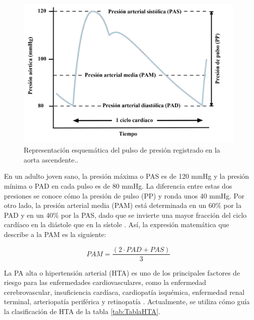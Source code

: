 \begin{figure}[h]
  \centering
  \includegraphics[width=\textwidth]{./Figures/aortic-pulse-pressure.png}
  \caption{Representación esquemática del pulso de presión registrado en la aorta ascendente.\protect\footnotemark.}\label{fig:aorticPulse}
\end{figure}


En un adulto joven sano, la presión máxima o PAS es de 
120 mmHg y la presión mínima o PAD en cada pulso es de 80 mmHg. La diferencia entre estas dos presiones 
se conoce cómo la presión de pulso (PP) y ronda unos 40 mmHg. Por otro lado, la presión arterial media (PAM) 
está determinada en un 60\% por la PAD y en un 40\% por la PAS, dado que se invierte una mayor fracción 
del ciclo cardíaco en la diástole que en la sístole \citep{CITE:2} \citep{CITE:3}. Así, la expresión matemática que describe 
a la PAM es la siguiente: 

\begin{equation}
	\label{eq:PAM}
	PAM = \frac{(2 \cdot PAD + PAS)}{3}
\end{equation}

La PA alta o hipertensión arterial (HTA) es uno de los principales factores de riesgo para las enfermedades 
cardiovasculares, como la enfermedad cerebrovascular, insuficiencia cardíaca, cardiopatía isquémica, 
enfermedad renal terminal, arteriopatía periférica y retinopatía \citep{CITE:6} \citep{CITE:7}. Actualmente, 
se utiliza cómo guía la clasificación de HTA de la tabla \ref{tab:TablaHTA}.

